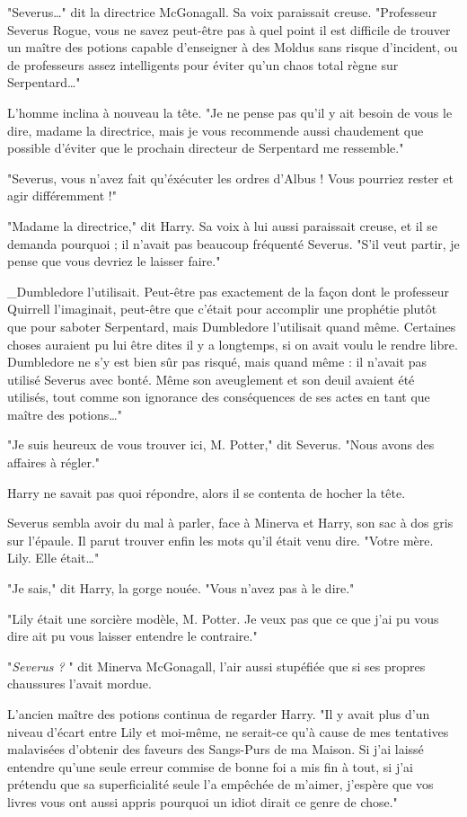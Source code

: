 "Severus…" dit la directrice McGonagall. Sa voix paraissait creuse. "Professeur Severus Rogue, vous ne savez peut-être pas à quel point il est difficile de trouver un maître des potions capable d'enseigner à des Moldus sans risque d'incident, ou de professeurs assez intelligents pour éviter qu'un chaos total règne sur Serpentard…"

L'homme inclina à nouveau la tête. "Je ne pense pas qu'il y ait besoin de vous le dire, madame la directrice, mais je vous recommende aussi chaudement que possible d'éviter que le prochain directeur de Serpentard me ressemble."

"Severus, vous n'avez fait qu'éxécuter les ordres d'Albus ! Vous pourriez rester et agir différemment !"

"Madame la directrice," dit Harry. Sa voix à lui aussi paraissait creuse, et il se demanda pourquoi ; il n'avait pas beaucoup fréquenté Severus. "S'il veut partir, je pense que vous devriez le laisser faire."

\_Dumbledore l'utilisait. Peut-être pas exactement de la façon dont le professeur Quirrell l'imaginait, peut-être que c'était pour accomplir une prophétie plutôt que pour saboter Serpentard, mais Dumbledore l'utilisait quand même. Certaines choses auraient pu lui être dites il y a longtemps, si on avait voulu le rendre libre. Dumbledore ne s'y est bien sûr pas risqué, mais quand même : il n'avait pas utilisé Severus avec bonté. Même son aveuglement et son deuil avaient été utilisés, tout comme son ignorance des conséquences de ses actes en tant que maître des potions…"

"Je suis heureux de vous trouver ici, M. Potter," dit Severus. "Nous avons des affaires à régler."

Harry ne savait pas quoi répondre, alors il se contenta de hocher la tête.

Severus sembla avoir du mal à parler, face à Minerva et Harry, son sac à dos gris sur l'épaule. Il parut trouver enfin les mots qu'il était venu dire. "Votre mère. Lily. Elle était…"

"Je sais," dit Harry, la gorge nouée. "Vous n'avez pas à le dire."

"Lily était une sorcière modèle, M. Potter. Je veux pas que ce que j'ai pu vous dire ait pu vous laisser entendre le contraire."

"\emph{Severus ?} " dit Minerva McGonagall, l'air aussi stupéfiée que si ses propres chaussures l'avait mordue.

L'ancien maître des potions continua de regarder Harry. "Il y avait plus d'un niveau d'écart entre Lily et moi-même, ne serait-ce qu'à cause de mes tentatives malavisées d'obtenir des faveurs des Sangs-Purs de ma Maison. Si j'ai laissé entendre qu'une seule erreur commise de bonne foi a mis fin à tout, si j'ai prétendu que sa superficialité seule l'a empêchée de m'aimer, j'espère que vos livres vous ont aussi appris pourquoi un idiot dirait ce genre de chose."

